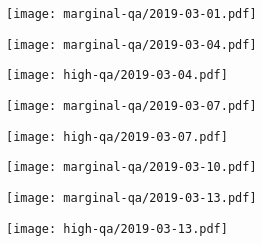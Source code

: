 \documentclass{article}
\begin{document}
\begin{figure}[H]
	\ContinuedFloat
	\centering
	\begin{subfigure}{\linewidth}
		\hspace{0.25cm}
		\texttt{[image: marginal-qa/2019-03-01.pdf]}
	\end{subfigure}
	\begin{subfigure}{0.48\linewidth}
		\texttt{[image: marginal-qa/2019-03-04.pdf]}
	\end{subfigure}
	\begin{subfigure}{0.48\linewidth}
		\texttt{[image: high-qa/2019-03-04.pdf]}
	\end{subfigure}
	\begin{subfigure}{0.48\linewidth}
		\texttt{[image: marginal-qa/2019-03-07.pdf]}
	\end{subfigure}
	\begin{subfigure}{0.48\linewidth}
		\texttt{[image: high-qa/2019-03-07.pdf]}
	\end{subfigure}
	\begin{subfigure}{\linewidth}
		\hspace{0.25cm}
		\texttt{[image: marginal-qa/2019-03-10.pdf]}
	\end{subfigure}
	\begin{subfigure}{0.48\linewidth}
		\texttt{[image: marginal-qa/2019-03-13.pdf]}
	\end{subfigure}
	\begin{subfigure}{0.48\linewidth}
		\texttt{[image: high-qa/2019-03-13.pdf]}
	\end{subfigure}
\end{figure}
\end{document}
